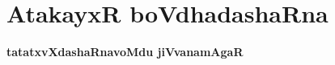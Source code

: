 \makeatletter
\def\@makechapterhead#1{%
  \vspace*{10\p@}%
{\fontsize{13pt}{13pt}\selectfont\raggedright{\bf  rAdhAkamalf muKajiR}\par}
\vspace*{25\p@}%
  {\parindent \z@ \centering \normalfont
    \ifnum \c@secnumdepth >\m@ne
      \if@mainmatter
        {\huge\bfseries  #1}\par\nobreak
	\vskip 4pt
      \fi
    \fi
\smallskip 

 \vskip 10\p@  
{\fontsize{12pt}{12pt}\selectfont\raggedleft{anu: \bf pu.ti.na.}\par}
  }
\vskip 40\p@}
\makeatother

\chapter{AtakayxR boVdhadashaRna}\label{chap002}


\begin{center}
{\Large\bf tatatxvXdashaRnavoMdu jiVvanamAgaR}
\end{center}

